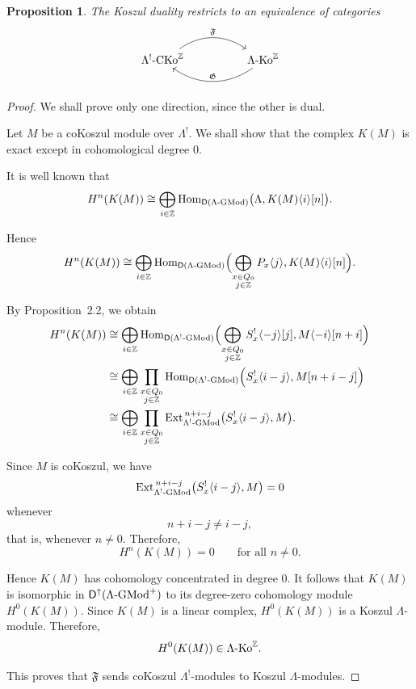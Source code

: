 \documentclass[11pt]{article}
\newtheorem{proposition}[theorem]{Proposition}
\theoremstyle{definition}
\theoremstyle{remark}
\begin{document}
\begin{proposition}
The Koszul duality restricts to an equivalence of categories
\[
\begin{tikzcd}[column sep=huge]
\Lambda^{!}\textup{-CKo}^{\mathbb{Z}}
\arrow[r, bend left=35, "\mathfrak{F}"]
&
\Lambda\textup{-Ko}^{\mathbb{Z}}
\arrow[l, bend left=35, "\mathfrak{G}"']
\end{tikzcd}
\]
\end{proposition}
\begin{proof}
We shall prove only one direction, since the other is dual.

Let \(M\) be a coKoszul module over \(\Lambda^{!}\). We shall show that the complex \(K(M)\) is exact except in cohomological degree \(0\).

It is well known that
\[
H^{n}(K(M))
\cong
\bigoplus_{i\in\mathbb Z}
\operatorname{Hom}_{\mathsf D(\Lambda\textup{-GMod})}
\bigl(\Lambda,K(M)\langle i\rangle[n]\bigr).
\]

Hence
\[
H^{n}(K(M))
\cong
\bigoplus_{i\in\mathbb Z}
\operatorname{Hom}_{\mathsf D(\Lambda\textup{-GMod})}
\Bigl(
\bigoplus_{\substack{x\in Q_{0}\\ j\in\mathbb Z}}
P_{x}\langle j\rangle,
K(M)\langle i\rangle[n]
\Bigr).
\]

By Proposition~2.2, we obtain
\[
\begin{aligned}
H^{n}(K(M))
&\cong
\bigoplus_{i\in\mathbb Z}
\operatorname{Hom}_{\mathsf D(\Lambda^{!}\textup{-GMod})}
\Bigl(
\bigoplus_{\substack{x\in Q_{0}\\ j\in\mathbb Z}}
S^{!}_{x}\langle -j\rangle[j],
M\langle -i\rangle[n+i]
\Bigr)
\\
&\cong
\bigoplus_{i\in\mathbb Z}
\prod_{\substack{x\in Q_{0}\\ j\in\mathbb Z}}
\operatorname{Hom}_{\mathsf D(\Lambda^{!}\textup{-GMod})}
\Bigl(
S^{!}_{x}\langle i-j\rangle,
M[n+i-j]
\Bigr)
\\
&\cong
\bigoplus_{i\in\mathbb Z}
\prod_{\substack{x\in Q_{0}\\ j\in\mathbb Z}}
\operatorname{Ext}^{\,n+i-j}_{\Lambda^{!}\textup{-GMod}}
\bigl(S^{!}_{x}\langle i-j\rangle,M\bigr).
\end{aligned}
\]

Since \(M\) is coKoszul, we have
\[
\operatorname{Ext}^{\,n+i-j}_{\Lambda^{!}\textup{-GMod}}
\bigl(S^{!}_{x}\langle i-j\rangle,M\bigr)
=
0
\]
whenever
\[
n+i-j\neq i-j,
\]
that is, whenever \(n\neq 0\). Therefore,
\[
H^{n}(K(M))=0
\qquad
\text{for all } n\neq 0.
\]

Hence \(K(M)\) has cohomology concentrated in degree \(0\). It follows that \(K(M)\) is isomorphic in
\(\mathsf{D}^{\uparrow}(\Lambda\textup{-GMod}^{+})\)
to its degree-zero cohomology module \(H^{0}(K(M))\). Since \(K(M)\) is a linear complex, \(H^{0}(K(M))\) is a Koszul \(\Lambda\)-module. Therefore,
\[
H^{0}(K(M))
\in
\Lambda\textup{-Ko}^{\mathbb Z}.
\]

\medskip 

This proves that \(\mathfrak{F}\) sends coKoszul \(\Lambda^{!}\)-modules to Koszul \(\Lambda\)-modules.
\end{proof}
\end{document}
